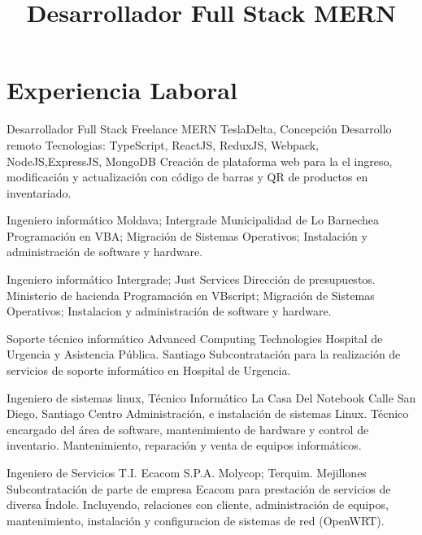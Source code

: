 \documentclass[draft,color,12pt,letterpaper,sans]{moderncv}
\title{Desarrollador Full Stack MERN}
\begin{document}
\makecvtitle %

\section{Experiencia Laboral}
{Desarrollador Full Stack Freelance MERN}
{TeslaDelta, Concepci\'on}
{\newline Desarrollo remoto}
{\newline Tecnologias: TypeScript, ReactJS, ReduxJS, Webpack, NodeJS,ExpressJS, MongoDB}
{Creaci\'on de plataforma web para la el ingreso, modificaci\'on y actualizaci\'on con c\'odigo de barras y QR de productos en inventariado.\newline}

{Ingeniero inform\'atico}
{Moldava; Intergrade}
{Municipalidad de Lo Barnechea}
{}
{Programaci\'on en VBA; Migraci\'on de Sistemas Operativos; Instalaci\'on y administraci\'on de software y hardware.\newline}


{Ingeniero inform\'atico}
{Intergrade; Just Services}
{Direcci\'on de presupuestos. Ministerio de hacienda}
{}
{Programaci\'on en VBscript; Migraci\'on de Sistemas Operativos; Instalacion y administraci\'on de software y hardware.\newline}

{Soporte t\'ecnico inform\'atico}
{Advanced Computing Technologies}
{Hospital de Urgencia y Asistencia P\'ublica. Santiago}
{}
{Subcontrataci\'on para la realizaci\'on de servicios de soporte inform\'atico en Hospital de Urgencia.\newline}

{Ingeniero de sistemas linux, T\'ecnico Inform\'atico}
{La Casa Del Notebook}
{Calle San Diego, Santiago Centro}
{}
{Administraci\'on, e instalaci\'on de sistemas Linux. T\'ecnico encargado del \'area de software, mantenimiento de hardware y control de inventario. Mantenimiento, reparaci\'on y venta de equipos inform\'aticos.\newline} 

{Ingeniero de Servicios T.I.}
{Ecacom S.P.A.}
{Molycop; Terquim. Mejillones}
{}
{Subcontrataci\'on de parte de empresa Ecacom para prestaci\'on de servicios de diversa \'Indole. Incluyendo, relaciones con cliente, administraci\'on de equipos, mantenimiento, instalaci\'on y configuracion de sistemas de red (OpenWRT).\newline}
\end{document}
